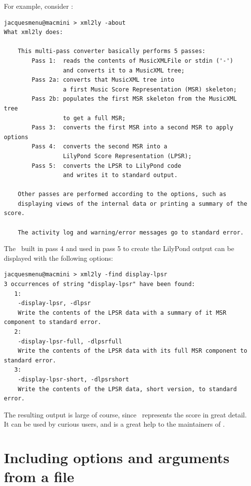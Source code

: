 For example, consider \xmlToLy:
\begin{lstlisting}[language=Terminal]
jacquesmenu@macmini > xml2ly -about
What xml2ly does:

    This multi-pass converter basically performs 5 passes:
        Pass 1:  reads the contents of MusicXMLFile or stdin ('-')
                 and converts it to a MusicXML tree;
        Pass 2a: converts that MusicXML tree into
                 a first Music Score Representation (MSR) skeleton;
        Pass 2b: populates the first MSR skeleton from the MusicXML tree
                 to get a full MSR;
        Pass 3:  converts the first MSR into a second MSR to apply options
        Pass 4:  converts the second MSR into a
                 LilyPond Score Representation (LPSR);
        Pass 5:  converts the LPSR to LilyPond code
                 and writes it to standard output.

    Other passes are performed according to the options, such as
    displaying views of the internal data or printing a summary of the score.

    The activity log and warning/error messages go to standard error.
\end{lstlisting}

The \lpsrRepr\ built in pass 4 and used in pass 5 to create the LilyPond output can be displayed with the following options:
\begin{lstlisting}[language=Terminal]
jacquesmenu@macmini > xml2ly -find display-lpsr
3 occurrences of string "display-lpsr" have been found:
   1:
    -display-lpsr, -dlpsr
    Write the contents of the LPSR data with a summary of it MSR component to standard error.
   2:
    -display-lpsr-full, -dlpsrfull
    Write the contents of the LPSR data with its full MSR component to standard error.
   3:
    -display-lpsr-short, -dlpsrshort
    Write the contents of the LPSR data, short version, to standard error.
\end{lstlisting}

The resulting output is large of course, since \lpsrRepr\ represents the score in great detail.
It can be used by curious users, and is a great help to the maintainers of \mf.


\chapter{Including options and arguments from a file}\label{Including options and arguments from a file}

